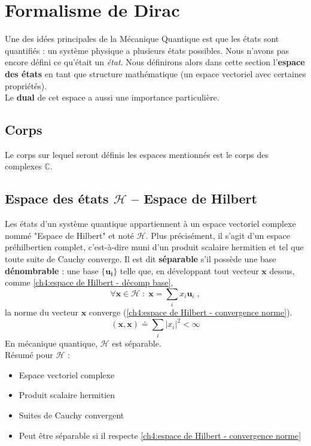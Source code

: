 \documentclass[../notesdecours.tex]{subfiles}
\begin{document}
\section{Formalisme de Dirac}
Une des idées principales de la Mécanique Quantique est que les états sont quantifiés : un système physique a plusieurs états possibles. Nous n'avons pas encore défini ce qu'était un \textit{état}. Nous définirons alors dans cette section l'\textbf{espace des états} en tant que structure mathématique (un espace vectoriel avec certaines propriétés). \\

Le \textbf{dual} de cet espace a aussi une importance particulière.

\subsection{Corps}
Le corps sur lequel seront définis les espaces mentionnés est le corps des complexes $\mathbb{C}$.

\subsection{Espace des états $\mathcal{H}$ -- Espace de Hilbert}
Les états d'un système quantique appartiennent à un espace vectoriel complexe nommé "Espace de Hilbert" et noté $\mathcal{H}$. Plus précisément, il s'agit d'un espace préhilbertien complet, c'est-à-dire muni d'un produit scalaire hermitien et tel que toute suite de Cauchy converge. Il est dit \textbf{séparable} s'il possède une base \textbf{dénombrable} : une base $\{\bm{u_i}\}$ telle que, en développant tout vecteur $\bm{x}$ dessus, comme \eqref{ch4:espace de Hilbert - décomp base}, 
\begin{equation}\label{ch4:espace de Hilbert - décomp base}
    \forall \bm{x} \in \mathcal{H} \; : \; \bm{x} = \sum_i x_i \bm{u}_i \; ,
\end{equation}
la norme du vecteur $\bm{x}$ converge (\eqref{ch4:espace de Hilbert - convergence norme}).
\begin{equation} \label{ch4:espace de Hilbert - convergence norme}
    (\bm{x}, \bm{x}) \doteq \sum_i |x_i| ^2 < \infty
\end{equation}
En mécanique quantique, $\mathcal{H}$ est séparable. \\

Résumé pour $\mathcal{H}$ :
\begin{itemize}
    \item Espace vectoriel complexe
    \item Produit scalaire hermitien
    \item Suites de Cauchy convergent
    \item Peut être séparable si il respecte \eqref{ch4:espace de Hilbert - convergence norme}
\end{itemize}
\end{document}
